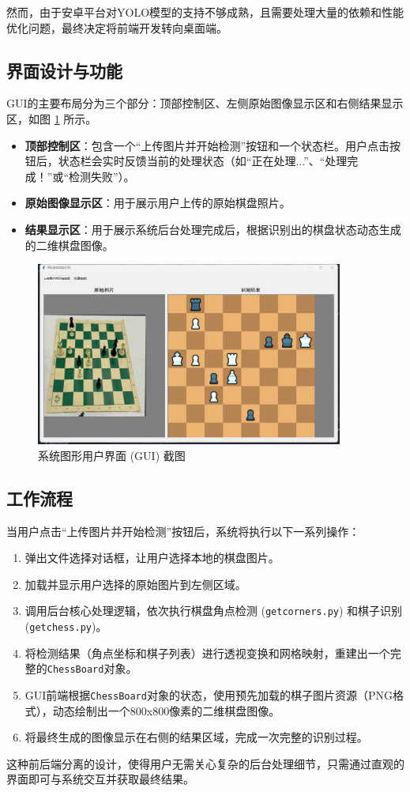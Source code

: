 \documentclass[12pt, a4paper]{article}
\begin{document}
然而，由于安卓平台对YOLO模型的支持不够成熟，且需要处理大量的依赖和性能优化问题，最终决定将前端开发转向桌面端。


\subsection{界面设计与功能}
GUI的主要布局分为三个部分：顶部控制区、左侧原始图像显示区和右侧结果显示区，如图 \ref{fig:gui} 所示。
\begin{itemize}
    \item \textbf{顶部控制区}：包含一个“上传图片并开始检测”按钮和一个状态栏。用户点击按钮后，状态栏会实时反馈当前的处理状态（如“正在处理...”、“处理完成！”或“检测失败”）。
    \item \textbf{原始图像显示区}：用于展示用户上传的原始棋盘照片。
    \item \textbf{结果显示区}：用于展示系统后台处理完成后，根据识别出的棋盘状态动态生成的二维棋盘图像。
\end{itemize}

\begin{figure}[h!]
    \centering
    \includegraphics[width=0.9\textwidth]{image/gui.png} 
    \caption{系统图形用户界面 (GUI) 截图}
    \label{fig:gui}
\end{figure}

\subsection{工作流程}
当用户点击“上传图片并开始检测”按钮后，系统将执行以下一系列操作：
\begin{enumerate}
    \item 弹出文件选择对话框，让用户选择本地的棋盘图片。
    \item 加载并显示用户选择的原始图片到左侧区域。
    \item 调用后台核心处理逻辑，依次执行棋盘角点检测 (\texttt{getcorners.py}) 和棋子识别 (\texttt{getchess.py})。
    \item 将检测结果（角点坐标和棋子列表）进行透视变换和网格映射，重建出一个完整的\texttt{ChessBoard}对象。
    \item GUI前端根据\texttt{ChessBoard}对象的状态，使用预先加载的棋子图片资源（PNG格式），动态绘制出一个800x800像素的二维棋盘图像。
    \item 将最终生成的图像显示在右侧的结果区域，完成一次完整的识别过程。
\end{enumerate}
这种前后端分离的设计，使得用户无需关心复杂的后台处理细节，只需通过直观的界面即可与系统交互并获取最终结果。
\end{document}
